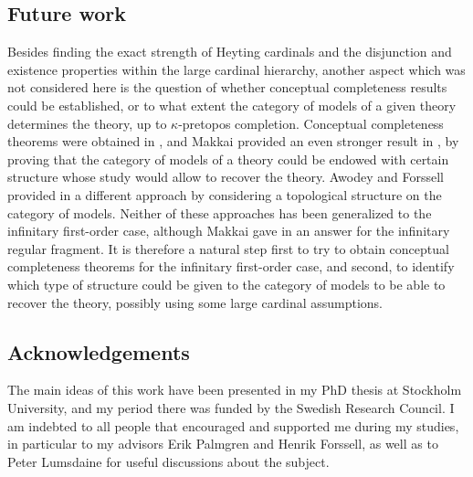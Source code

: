 \documentclass[a4paper,11pt]{article}
\theoremstyle{plain}
\theoremstyle{plain}
\theoremstyle{remark}
\begin{document}
\subsection{Future work}

Besides finding the exact strength of Heyting cardinals and the disjunction and existence properties within the large cardinal hierarchy, another aspect which was not considered here is the question of whether conceptual completeness results could be established, or to what extent the category of models of a given theory determines the theory, up to $\kappa$-pretopos completion. Conceptual completeness theorems were obtained in \cite{mr}, and Makkai provided an even stronger result in \cite{makkai2}, by proving that the category of models of a theory could be endowed with certain structure whose study would allow to recover the theory. Awodey and Forssell provided in \cite{af} a different approach by considering a topological structure on the category of models. Neither of these approaches has been generalized to the infinitary first-order case, although Makkai gave in \cite{makkai} an answer for the infinitary regular fragment. It is therefore a natural step first to try to obtain conceptual completeness theorems for the infinitary first-order case, and second, to identify which type of structure could be given to the category of models to be able to recover the theory, possibly using some large cardinal assumptions.

\subsection{Acknowledgements} The main ideas of this work have been presented in my PhD thesis at Stockholm University, and my period there was funded by the Swedish Research Council. I am indebted to all people that encouraged and supported me during my studies, in particular to my advisors Erik Palmgren and Henrik Forssell, as well as to Peter Lumsdaine for useful discussions about the subject.





\renewcommand{\bibname}{References} %



%
\end{document}
